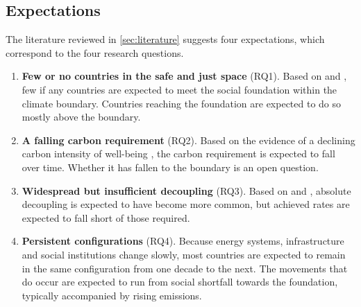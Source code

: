 \subsection{Expectations}

The literature reviewed in \cref{sec:literature} suggests four expectations, which correspond to the four research questions.

\begin{enumerate}[label=\textbf{E\arabic*.},leftmargin=2.5em]
\item \textbf{Few or no countries in the safe and just space} (RQ1). Based on \citet{oneill2018} and \citet{fanning2022}, few if any countries are expected to meet the social foundation within the climate boundary. Countries reaching the foundation are expected to do so mostly above the boundary.
\item \textbf{A falling carbon requirement} (RQ2). Based on the evidence of a declining carbon intensity of well-being \citep{steinberger2010,jorgenson2014}, the carbon requirement is expected to fall over time. Whether it has fallen to the boundary is an open question.
\item \textbf{Widespread but insufficient decoupling} (RQ3). Based on \citet{haberl2020} and \citet{vogel2023}, absolute decoupling is expected to have become more common, but achieved rates are expected to fall short of those required.
\item \textbf{Persistent configurations} (RQ4). Because energy systems, infrastructure and social institutions change slowly, most countries are expected to remain in the same configuration from one decade to the next. The movements that do occur are expected to run from social shortfall towards the foundation, typically accompanied by rising emissions.
\end{enumerate}
